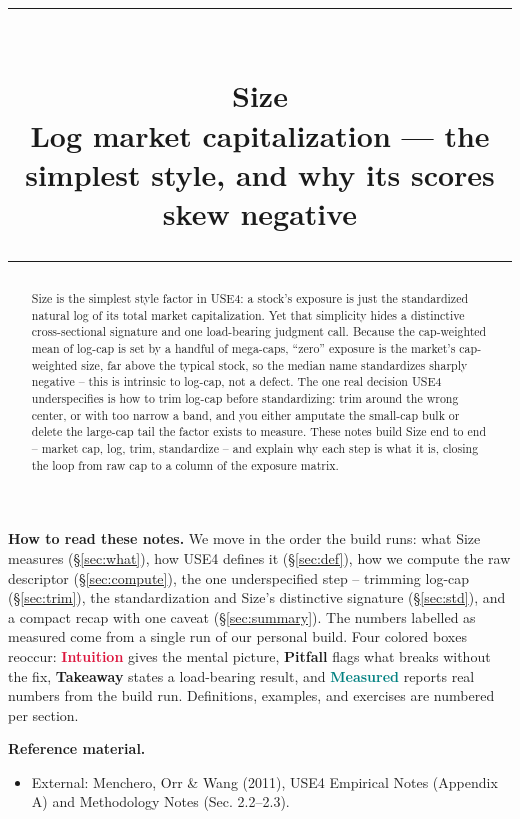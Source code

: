 \documentclass[11pt]{article}
\title{\vspace{-2.2em}
  {\color{steel}\rule{\textwidth}{1.3pt}}\\[0.7em]
  \Huge\bfseries Size\\[0.35em]
  \large\mdseries Log market capitalization --- the simplest style, and why its scores skew negative\\[0.4em]
  {\color{steel}\rule{\textwidth}{0.7pt}}}
\author{}
\date{}
\theoremstyle{definition}
\theoremstyle{plain}
\theoremstyle{remark}
\begin{document}
\maketitle
\thispagestyle{empty}

\begin{abstract}
Size is the simplest style factor in USE4: a stock's exposure is just the standardized natural log of its total market capitalization. Yet that simplicity hides a distinctive cross-sectional signature and one load-bearing judgment call. Because the cap-weighted mean of log-cap is set by a handful of mega-caps, ``zero'' exposure is the market's cap-weighted size, far above the typical stock, so the median name standardizes sharply negative -- this is intrinsic to log-cap, not a defect. The one real decision USE4 underspecifies is how to trim log-cap before standardizing: trim around the wrong center, or with too narrow a band, and you either amputate the small-cap bulk or delete the large-cap tail the factor exists to measure. These notes build Size end to end -- market cap, log, trim, standardize -- and explain why each step is what it is, closing the loop from raw cap to a column of the exposure matrix.
\end{abstract}

\begin{tcolorbox}[colback=paperlt,colframe=ink!30,boxrule=0.4pt,arc=2pt,left=10pt,right=10pt,top=8pt,bottom=8pt]
\textbf{How to read these notes.} We move in the order the build runs: what Size measures (\S\ref{sec:what}), how USE4 defines it (\S\ref{sec:def}), how we compute the raw descriptor (\S\ref{sec:compute}), the one underspecified step -- trimming log-cap (\S\ref{sec:trim}), the standardization and Size's distinctive signature (\S\ref{sec:std}), and a compact recap with one caveat (\S\ref{sec:summary}). The numbers labelled as measured come from a single run of our personal build. Four colored boxes reoccur: \textcolor{crimson}{\textbf{Intuition}} gives the mental picture, \textcolor{amber}{\textbf{Pitfall}} flags what breaks without the fix, \textcolor{steel}{\textbf{Takeaway}} states a load-bearing result, and \textcolor{teal}{\textbf{Measured}} reports real numbers from the build run. Definitions, examples, and exercises are numbered per section.

\smallskip
\textbf{Reference material.}
\begin{itemize}[leftmargin=1.4em,topsep=2pt,itemsep=1pt]
  \item External: Menchero, Orr \& Wang (2011), USE4 Empirical Notes (Appendix A) and Methodology Notes (Sec. 2.2--2.3).
\end{itemize}
\end{tcolorbox}
\end{document}
